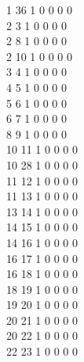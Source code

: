 \documentclass[11pt,titlepage,dvipdfmx,twoside]{article}
\begin{document}
\begin{oframed}
{  1 36  1  0  0  0  0                                                   \\
  2  3  1  0  0  0  0                                                   \\
  2  8  1  0  0  0  0                                                   \\
  2 10  1  0  0  0  0                                                   \\
  3  4  1  0  0  0  0                                                   \\
  4  5  1  0  0  0  0                                                   \\
  5  6  1  0  0  0  0                                                   \\
  6  7  1  0  0  0  0                                                   \\
  8  9  1  0  0  0  0                                                   \\
 10 11  1  0  0  0  0                                                   \\
 10 28  1  0  0  0  0                                                   \\
 11 12  1  0  0  0  0                                                   \\
 11 13  1  0  0  0  0                                                   \\
 13 14  1  0  0  0  0                                                   \\
 14 15  1  0  0  0  0                                                   \\
 14 16  1  0  0  0  0                                                   \\
 16 17  1  0  0  0  0                                                   \\
 16 18  1  0  0  0  0                                                   \\
 18 19  1  0  0  0  0                                                   \\
 19 20  1  0  0  0  0                                                   \\
 20 21  1  0  0  0  0                                                   \\
 20 22  1  0  0  0  0                                                   \\
 22 23  1  0  0  0  0                                                   \\
}
\end{oframed}
\end{document}
